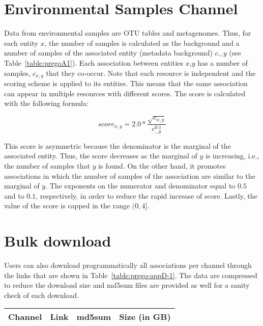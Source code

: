 {\section*{Environmental Samples Channel}

Data from environmental samples are OTU tables and metagenomes. 
Thus, for each entity $x$, the number of samples is calculated as the background 
and a number of samples of the associated entity (metadata background) $c.,y$ (see Table~\ref{table:pregoA1}). 
Each association between entities $x$,$y$ has a number of samples, $c_{x,y}$ that they co-occur. 
Note that each resource is independent and the scoring scheme is applied to its entities. 
This means that the same association can appear in multiple resources with different scores. 
The score is calculated with the following formula:

\begin{equation}
   score_{x,y} = 2.0*{\frac{\sqrt{c_{x,y}}}{c_{.,y}^{0.1}}}
\end{equation}


This score is asymmetric because the denominator is the marginal of the associated entity. 
Thus, the score decreases as the marginal of $y$ is increasing, i.e., the number of samples that $y$ is found. 
On the other hand, it promotes associations in which the number of samples of 
the association are similar to the marginal of $y$. 
The exponents on the numerator and denominator equal to $0.5$ and 
to $0.1$, respectively, in order to reduce the rapid increase of score.
Lastly, the value of the score is capped in the range $(0,4]$.


\section{Bulk download}
\label{app:D}

   Users can also download programmatically all associations per channel through the links that are shown in Table~\ref{table:prego-appD-1}. 
   The data are compressed to reduce the download size and md5sum files are provided as well for a sanity check of each download.

   \begin{table}[ht]
      
      \begin{adjustwidth}{-2cm}{}

      \begin{tabular}{llll}
      \toprule
      Channel & Link & md5sum & Size (in GB) \\ \midrule


\end{tabular}
\end{adjustwidth}
\end{table}}
